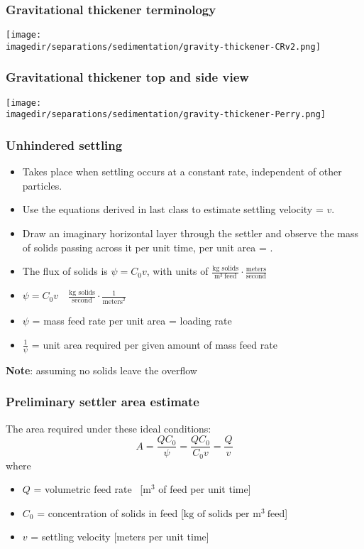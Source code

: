 \begin{frame}\frametitle{Gravitational thickener terminology}
	\begin{center}
		\texttt{[image: \\imagedir/separations/sedimentation/gravity-thickener-CRv2.png]}
	\end{center}
\end{frame}

\begin{frame}\frametitle{Gravitational thickener top and side view}
	\begin{center}
		\texttt{[image: \\imagedir/separations/sedimentation/gravity-thickener-Perry.png]}
	\end{center}
\end{frame}

\begin{frame}\frametitle{Unhindered settling}
	\begin{itemize}
		\item	Takes place when settling occurs at a constant rate, independent of other particles.
		\item	Use the equations derived in last class to estimate settling velocity = $v$.
		\item	Draw an imaginary horizontal layer through the settler and observe the mass of solids passing across it per unit time, per unit area = {\color{myOrange}{mass flux}}.
		\item	The flux of solids is $\psi = C_0 v$, with units of $\displaystyle \frac{\text{kg solids}}{\text{m}^3~\text{feed}} \cdot \frac{\text{meters}}{\text{second}}$
		\item	$ \psi = C_0 v \quad \displaystyle \frac{\text{kg solids}}{\text{second}} \cdot \frac{1}{\text{meters}^2}$
		\item	$\psi$ = mass feed rate per unit area = loading rate
		\item	$\displaystyle \frac{1}{\psi}$ = unit area required per given amount of mass feed rate
	\end{itemize}
	\textbf{Note}: assuming no solids leave the overflow
\end{frame}

\begin{frame}\frametitle{Preliminary settler area estimate}
	The area required under these ideal conditions:
	\[
		A = \displaystyle \frac{Q C_0}{\psi} = \displaystyle \frac{Q C_0}{C_0 v} = \displaystyle \frac{Q}{v}
	\]
	where 
	\begin{itemize}
		\item	$Q$ = volumetric feed rate~ [$\text{m}^3$ of feed per unit time]
		\item	$C_0$ = concentration of solids in feed [$\text{kg of solids per~}\text{m}^{3}~\text{feed}$]
		\item	$v$ = settling velocity [meters per unit time]
	\end{itemize}	
\end{frame}

